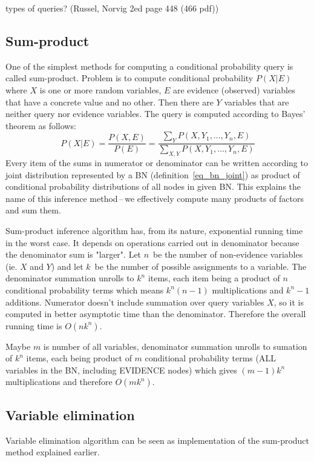 \documentclass[english,cover]{fitthesis} %
\newcommand{\todo}[1]{{\color{red} #1}}
\newcommand{\uncertain}[1]{{\color{magenta} #1}}
\begin{document}
\todo{types of queries? (Russel, Norvig 2ed page 448 (466 pdf))}

\subsection{Sum-product}
One of the simplest methods for computing a conditional probability query is called sum-product. Problem is to compute conditional probability $P(X | E)$ where $X$ is one or more random variables, $E$ are evidence (observed) variables that have a concrete value and no other. Then there are $Y$ variables that are neither query nor evidence variables. The query is computed according to Bayes' theorem as follows:
\begin{equation*}
P(X|E)
 = \frac{P(X, E)} {P(E)}
 = \frac{\sum_Y P(X, Y_1, \dots, Y_n, E)}{\sum_{X,Y} P(X, Y_1, \dots, Y_n, E)}
\end{equation*}
Every item of the sums in numerator or denominator can be written according to joint distribution represented by a BN (definition~\eqref{eq_bn_joint}) as product of conditional probability distributions of all nodes in given BN. This explains the name of this inference method\,--\,we effectively compute many products of factors and sum them.

Sum-product inference algorithm has, from its nature, exponential running time in the worst case. It depends on operations carried out in denominator because the denominator sum is "larger". \uncertain{Let $n$~be the number of non-evidence variables} (ie. $X$ and $Y$) and let $k$~be the number of possible assignments to a variable. The denominator summation unrolls to $k^n$ items, each item being a product of $n$ conditional probability terms which means $k^n (n-1)$ multiplications and $k^n - 1$ additions. Numerator doesn't include summation over query variables $X$, so it is computed in better asymptotic time than the denominator. Therefore the overall running time is $O(n k^n)$.

\uncertain{Maybe $m$ is number of all variables, denominator summation unrolls to sumation of $k^n$ items, each being product of $m$ conditional probability terms (ALL variables in the BN, including EVIDENCE nodes) which gives $(m-1)k^n$ multiplications and therefore $O(m k^n)$.}

\subsection{Variable elimination}
Variable elimination algorithm can be seen as implementation of the sum-product method explained earlier.
\end{document}
